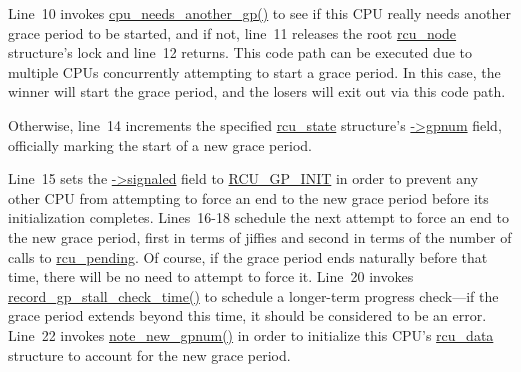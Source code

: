 Line~10 invokes \url{cpu_needs_another_gp()} to see if this CPU really
needs another grace period to be started, and if not, line~11
releases the root \url{rcu_node} structure's lock and line~12 returns.
This code path can be executed due to multiple CPUs concurrently
attempting to start a grace period.
In this case, the winner will start the grace period, and the losers
will exit out via this code path.

Otherwise, line~14 increments the specified \url{rcu_state} structure's
\url{->gpnum} field, officially marking the start of a new grace
period.

 \QuickQuizEnd

Line~15 sets the \url{->signaled} field to \url{RCU_GP_INIT} in order
to prevent any other CPU from attempting to force an end to the new
grace period before its initialization completes.
Lines~16-18 schedule the next attempt to force an end to the new
grace period, first in terms of jiffies and second in terms of the
number of calls to \url{rcu_pending}.
Of course, if the grace period ends naturally before that time,
there will be no need to attempt to force it.
Line~20 invokes \url{record_gp_stall_check_time()} to schedule a
longer-term progress check---if the grace period extends beyond this
time, it should be considered to be an error.
Line~22 invokes \url{note_new_gpnum()} in order to initialize this
CPU's \url{rcu_data} structure to account for the new grace period.

